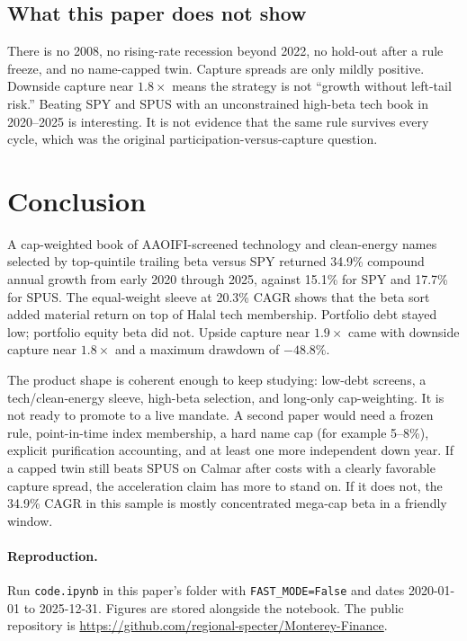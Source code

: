 \documentclass[11pt,letterpaper]{article}
\begin{document}
\subsection{What this paper does not show}

There is no 2008, no rising-rate recession beyond 2022, no hold-out after a rule freeze, and no name-capped twin. Capture spreads are only mildly positive. Downside capture near $1.8\times$ means the strategy is not ``growth without left-tail risk.'' Beating SPY and SPUS with an unconstrained high-beta tech book in 2020--2025 is interesting. It is not evidence that the same rule survives every cycle, which was the original participation-versus-capture question.

\section{Conclusion}
\label{sec:conc}

A cap-weighted book of AAOIFI-screened technology and clean-energy names selected by top-quintile trailing beta versus SPY returned 34.9\% compound annual growth from early 2020 through 2025, against 15.1\% for SPY and 17.7\% for SPUS. The equal-weight sleeve at 20.3\% CAGR shows that the beta sort added material return on top of Halal tech membership. Portfolio debt stayed low; portfolio equity beta did not. Upside capture near $1.9\times$ came with downside capture near $1.8\times$ and a maximum drawdown of $-48.8\%$.

The product shape is coherent enough to keep studying: low-debt screens, a tech/clean-energy sleeve, high-beta selection, and long-only cap-weighting. It is not ready to promote to a live mandate. A second paper would need a frozen rule, point-in-time index membership, a hard name cap (for example 5--8\%), explicit purification accounting, and at least one more independent down year. If a capped twin still beats SPUS on Calmar after costs with a clearly favorable capture spread, the acceleration claim has more to stand on. If it does not, the 34.9\% CAGR in this sample is mostly concentrated mega-cap beta in a friendly window.

\paragraph{Reproduction.}
Run \texttt{code.ipynb} in this paper's folder with \texttt{FAST\_MODE=False} and dates 2020-01-01 to 2025-12-31. Figures are stored alongside the notebook. The public repository is \url{https://github.com/regional-specter/Monterey-Finance}.
\end{document}
